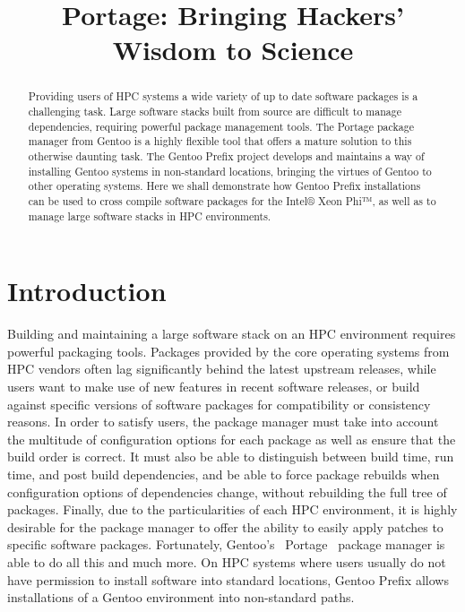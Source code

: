 \documentclass[a4paper,conference]{IEEEtran}
\title{Portage: Bringing Hackers' Wisdom to Science}
\author{
  \IEEEauthorblockN{Guilherme Amadio}
  \IEEEauthorblockA{São Paulo State University, Brazil\\
                    Gentoo Linux\\amadio@gentoo.org}
  \and
  \IEEEauthorblockN{Benda Xu}
  \IEEEauthorblockA{The University of Tokyo, Japan\\
                    Gentoo Linux\\heroxbd@gentoo.org}
}
\begin{document}
\maketitle

\begin{abstract}

Providing users of HPC systems a wide variety of up to date software
packages is a challenging task. Large software stacks built from source
are difficult to manage dependencies, requiring powerful package
management tools. The Portage package manager from Gentoo is a highly
flexible tool that offers a mature solution to this otherwise daunting
task. The Gentoo Prefix project develops and maintains a way of
installing Gentoo systems in non-standard locations, bringing the
virtues of Gentoo to other operating systems. Here we shall demonstrate
how Gentoo Prefix installations can be used to cross compile software
packages for the Intel® Xeon Phi™, as well as to manage large software
stacks in HPC environments.

\end{abstract}

\section{Introduction}

Building and maintaining a large software stack on an HPC environment
requires powerful packaging tools. Packages provided by the core operating
systems from HPC vendors often lag significantly behind the latest
upstream releases, while users want to make use of new features in
recent software releases, or build against specific versions of software
packages for compatibility or consistency reasons. In order to satisfy
users, the package manager must take into account the multitude of
configuration options for each package as well as ensure that the build
order is correct. It must also be able to distinguish between build
time, run time, and post build dependencies, and be able to force
package rebuilds when configuration options of dependencies change,
without rebuilding the full tree of packages. Finally, due to the
particularities of each HPC environment, it is highly desirable for the
package manager to offer the ability to easily apply patches to specific
software packages. Fortunately, Gentoo's~\cite{gentoo} Portage~\cite{gentoo:portage}
package manager is able to do all this and much
more. On HPC systems where users usually do not have permission to
install software into standard locations, Gentoo Prefix
\cite{gentoo:prefix} allows installations of a Gentoo environment into
non-standard paths.
\end{document}
